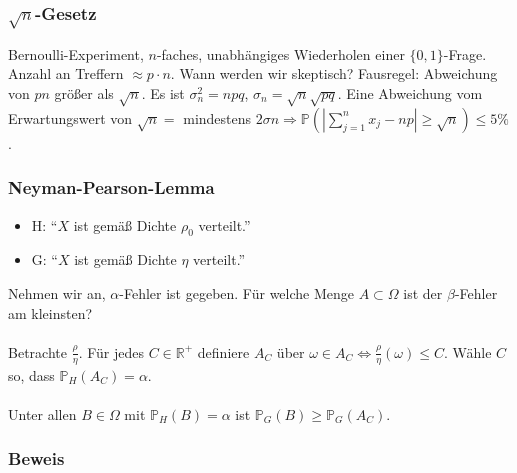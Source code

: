 \subsubsection{$\sqrt{n}$-Gesetz}
Bernoulli-Experiment, $n$-faches, unabh\"angiges Wiederholen einer $\{0,1\}$-Frage. Anzahl an Treffern $\approx p\cdot n$. Wann werden wir skeptisch? Fausregel: Abweichung von $pn$ gr\"o\ss{}er als $\sqrt{n}$. Es ist $\sigma_n^2=npq$, $\sigma_n=\sqrt{n}\sqrt{pq}$. Eine Abweichung vom Erwartungswert von $\sqrt{n}=$ mindestens $2\sigma n\Rightarrow\mathbb{P}(|\sum_{j=1}^nx_j-np|\geq\sqrt{n})\leq5\%$.
\subsubsection{Neyman-Pearson-Lemma}
\begin{itemize}
\item H: ``$X$ ist gem\"a\ss{} Dichte $\rho_0$ verteilt.''
\item G: ``$X$ ist gem\"a\ss{} Dichte $\eta$ verteilt.''
\end{itemize}
 Nehmen wir an, $\alpha$-Fehler ist gegeben. F\"ur welche Menge $A\subset\Omega$ ist der $\beta$-Fehler am kleinsten?
\\~\\
 Betrachte $\frac{\rho}{\eta}$. F\"ur jedes $C\in\mathbb{R}^+$ definiere $A_C$ \"uber $\omega\in A_C\Leftrightarrow\frac{\rho}{\eta}(\omega)\leq C$. W\"ahle $C$ so, dass $\mathbb{P}_H(A_C)=\alpha$.
\\~\\
 Unter allen $B\in\Omega$ mit $\mathbb{P}_H(B)=\alpha$ ist $\mathbb{P}_G(B)\geq\mathbb{P}_G(A_C)$.
\subsubsection{Beweis}
\weg
